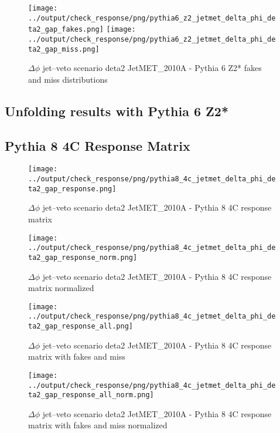 \documentclass[11pt]{book}
\begin{document}
\begin{figure}[ht]
\centering
\texttt{[image: ../output/check\_response/png/pythia6\_z2\_jetmet\_delta\_phi\_deta2\_gap\_fakes.png]}
\texttt{[image: ../output/check\_response/png/pythia6\_z2\_jetmet\_delta\_phi\_deta2\_gap\_miss.png]}
\caption{$\Delta\phi$ jet--veto scenario deta2 JetMET\_2010A - Pythia 6 Z2* fakes and miss distributions}
\label{p6_jetmet_delta_phi_deta2_gap_fakesmiss}
\end{figure}


\clearpage
\subsection{Unfolding results with Pythia 6 Z2*}


\clearpage
\subsection{Pythia 8 4C Response Matrix}


\begin{figure}[ht]
\centering
\texttt{[image: ../output/check\_response/png/pythia8\_4c\_jetmet\_delta\_phi\_deta2\_gap\_response.png]}
\caption{$\Delta\phi$ jet--veto scenario deta2 JetMET\_2010A - Pythia 8 4C response matrix}
\label{p8_jetmet_delta_phi_deta2_gap_response}
\end{figure}

\begin{figure}[ht]
\centering
\texttt{[image: ../output/check\_response/png/pythia8\_4c\_jetmet\_delta\_phi\_deta2\_gap\_response\_norm.png]}
\caption{$\Delta\phi$ jet--veto scenario deta2 JetMET\_2010A - Pythia 8 4C response matrix normalized}
\label{p8_jetmet_delta_phi_deta2_gap_response_norm}
\end{figure}

\begin{figure}[ht]
\centering
\texttt{[image: ../output/check\_response/png/pythia8\_4c\_jetmet\_delta\_phi\_deta2\_gap\_response\_all.png]}
\caption{$\Delta\phi$ jet--veto scenario deta2 JetMET\_2010A - Pythia 8 4C response matrix with fakes and miss}
\label{p8_jetmet_delta_phi_deta2_gap_response_all}
\end{figure}

\begin{figure}[ht]
\centering
\texttt{[image: ../output/check\_response/png/pythia8\_4c\_jetmet\_delta\_phi\_deta2\_gap\_response\_all\_norm.png]}
\caption{$\Delta\phi$ jet--veto scenario deta2 JetMET\_2010A - Pythia 8 4C response matrix with fakes and miss normalized}
\label{p8_jetmet_delta_phi_deta2_gap_response_all_norm}
\end{figure}
\end{document}
